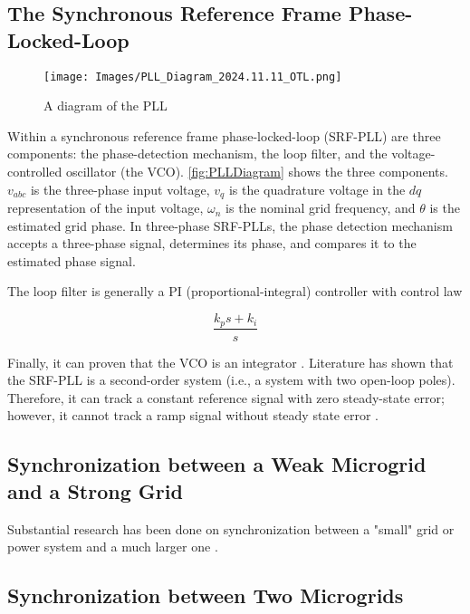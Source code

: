 \subsection{The Synchronous Reference Frame Phase-Locked-Loop}

\begin{figure}
    \centering
    \texttt{[image: Images/PLL\_Diagram\_2024.11.11\_OTL.png]}
    \caption{A diagram of the PLL}
    \label{fig:PLLDiagram}
\end{figure}

Within a synchronous reference frame phase-locked-loop (SRF-PLL) are three components: the phase-detection mechanism, the loop filter, and the voltage-controlled oscillator (the VCO). \autoref{fig:PLLDiagram} shows the three components. $v_{abc}$ is the three-phase input voltage, $v_q$ is the quadrature voltage in the $dq$ representation of the input voltage, $\omega_n$ is the nominal grid frequency, and $\theta$ is the estimated grid phase. In three-phase SRF-PLLs, the phase detection mechanism accepts a three-phase signal, determines its phase, and compares it to the estimated phase signal.

The loop filter is generally a PI (proportional-integral) controller with control law

\begin{equation}
    \frac{k_p s + k_i}{s}
\end{equation}

Finally, it can proven that the VCO is an integrator \cite{Blaabjerg_Grid_Synchronization}. Literature has shown that the SRF-PLL is a second-order system (i.e., a system with two open-loop poles). Therefore, it can track a constant reference signal with zero steady-state error; however, it cannot track a ramp signal without steady state error \cite{Guerrero_Vasquez_3PLL}. 

\subsection{Synchronization between a Weak Microgrid and a Strong Grid}

Substantial research has been done on synchronization between a "small" grid or power system and a much larger one \cite{Blaabjerg_Grid_Synchronization, Blaabjerg_Microgrids_Control, Guerrero_Hierarchical}.

\subsection{Synchronization between Two Microgrids}

